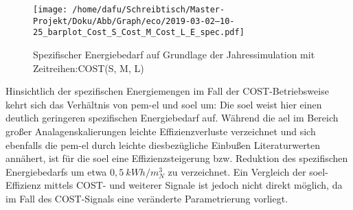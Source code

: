 \documentclass[onecolumn,10pt,titlepage]{article}
\begin{document}
%
%
%

\begin{figure}[H]

	\centering
	\texttt{[image: /home/dafu/Schreibtisch/Master-Projekt/Doku/Abb/Graph/eco/2019-03-02--10-25\_barplot\_Cost\_S\_Cost\_M\_Cost\_L\_E\_spec.pdf]}
	\caption[Spezifischer Energiebedarf -COST]{Spezifischer Energiebedarf auf Grundlage der Jahressimulation mit Zeitreihen:COST(S, M, L) }
	\label{fig:analy_COST_Espec}
\end{figure}

Hinsichtlich der spezifischen Energiemengen im Fall der COST-Betriebsweise kehrt sich das Verhältnis von \gls{pem}-\gls{el} und \gls{soel} um: Die \gls{soel} weist hier einen deutlich geringeren spezifischen Energiebedarf auf. Während die \gls{ael} im Bereich großer Analagenskalierungen leichte Effizienzverluste verzeichnet und sich ebenfalls die \gls{pem}-\gls{el} durch leichte diesbezügliche Einbußen Literaturwerten annähert, ist für die \gls{soel} eine Effizienzsteigerung bzw. Reduktion des spezifischen Energiebedarfs um etwa $0,5~kWh/m^3_N$ zu verzeichnet. Ein Vergleich der \gls{soel}-Effizienz mittels COST- und weiterer Signale ist jedoch nicht direkt möglich, da im Fall des COST-Signals eine veränderte Parametrierung vorliegt. %
\end{document}
